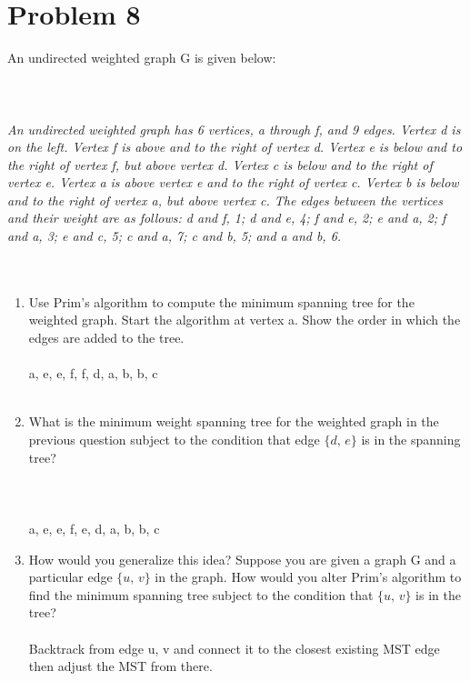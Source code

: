 \documentclass{amsart}
\theoremstyle{definition}
\theoremstyle{Exercise}
\theoremstyle{remark}
\theoremstyle{rule}
\numberwithin{equation}{section}
\begin{document}
\section*{Problem 8}
An undirected weighted graph G is given below:\\\\
\\\\
{\color{blue}{\bf Figure 16:} \emph{An undirected weighted graph has 6 vertices, a through f, and 9 edges. Vertex d is on the left. Vertex f is above and to the right of vertex d. Vertex e is below and to the right of vertex f, but above vertex d. Vertex c is below and to the right of vertex e. Vertex a is above vertex e and to the right of vertex c. Vertex b is below and to the right of vertex a, but above vertex c. The edges between the vertices and their weight are as follows: d and f, 1; d and e, 4; f and e, 2; e and a, 2; f and a, 3; e and c, 5; c and a, 7; c and b, 5; and a and b, 6.
\\
}
}
\\
\\
\begin{enumerate}[label=(\alph*)]
\item Use Prim's algorithm to compute the minimum spanning tree for the weighted graph. Start the algorithm at vertex a. Show the order in which the edges are added to the tree.\\\\
{a, e}, {e, f}, {f, d}, {a, b}, {b, c}
\\\\
\item What is the minimum weight spanning tree for the weighted graph in the previous question subject to the condition that edge $\{d,\, e\}$ is in the spanning tree?\\\\\\\\
{a, e}, {e, f}, {e, d}, {a, b}, {b, c}
\item How would you generalize this idea? Suppose you are given a graph G and a particular edge $\{u,\,v\}$ in the graph. How would you alter Prim's algorithm to find the minimum spanning tree subject to the condition that $\{u,\,v\}$ is in the tree?\\\\
Backtrack from edge {u, v} and connect it to the closest existing MST edge then adjust the MST from there.
\\\\
\end{enumerate}
\end{document}
